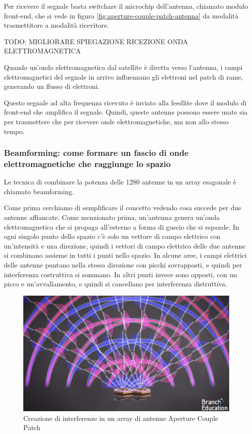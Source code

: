 Per ricevere il segnale basta switchare il microchip dell'antenna, chiamato modulo front-end, che si vede in figura \ref{fig:aperture-couple-patch-antenna} da modalità trasmettitore a modalità ricevitore.

TODO: MIGLIORARE SPIEGAZIONE RICEZIONE ONDA ELETTROMAGNETICA

Quando un'onda elettromagnetica dal satellite è diretta verso l'antenna, i campi elettromagnetici del segnale in arrivo influenzano gli elettroni nel patch di rame, generando un flusso di elettroni.

Questo segnale ad alta frequenza ricevuto è inviato alla feedlite dove il modulo di front-end che amplifica il segnale.
Quindi, queste antenne possono essere usate sia per trasmettere che per ricevere onde elettromagnetiche, ma non allo stesso tempo.\cite{branch_education_how_2022}

\subsubsection{Beamforming: come formare un fascio di onde elettromagnetiche che raggiunge lo spazio}
Le tecnica di combinare la potenza delle 1280 antenne in un array esagonale è chiamato beamforming.

Come prima cerchiamo di semplificare il concetto vedendo cosa succede per due antenne affiancate.
Come menzionato prima, un'antenna genera un'onda elettromagnetica che si propaga all'esterno a forma di guscio che si espande.
In ogni singolo punto dello spazio c'è solo un vettore di campo elettrico con un'intensità e una direzione, quindi i vettori di campo elettrico delle due antenne si combinano assieme in tutti i punti nello spazio.
In alcune aree, i campi elettrici delle antenne puntano nella stessa direzione con picchi sovrapposti, e quindi per interferenza costruttiva si sommano.
In altri punti invece sono opposti, con un picco e un'avvallamento, e quindi si cancellano per interferenza distruttiva.

\begin{figure}[htbp]
  \centering
  \includegraphics[width=0.8\linewidth]{./res/img/antenna_interference.png}
  \caption{Creazione di interferenze in un array di antenne Aperture Couple Patch \cite{branch_education_how_2022}}
  \label{fig:aperture-couple-patch-antenna-interference}
\end{figure}

